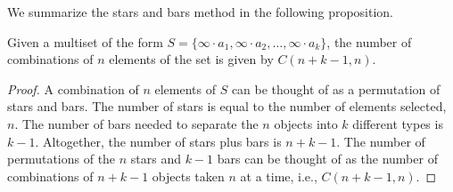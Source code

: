 \documentclass[handout]{ximera}
\begin{document}
We summarize the stars and bars method in the following proposition.

\begin{proposition}
Given a multiset of the form $S = \{\infty \cdot a_1, \infty \cdot a_2, \ldots, \infty \cdot a_k\}$, 
the number of combinations of $n$ elements of the set is given by
$C(n+k-1, n)$.
\end{proposition}
\begin{proof}
A combination of $n$ elements of $S$ can be thought of as a permutation of stars and bars. 
The number of stars is equal to the number of elements selected, $n$. 
The number of bars needed to separate the $n$ objects into $k$ different types is $k-1$. 
Altogether, the number of stars plus bars is $n + k-1$. 
The number of permutations of the $n$ stars and $k-1$ bars can be thought of as 
the number of combinations of $n+k-1$ objects taken $n$ at a time, i.e., $C(n+k-1,n)$. 
\end{proof}
\end{document}
